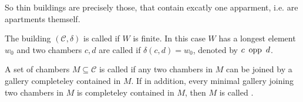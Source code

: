 So thin buildings are precisely those, that contain excatly one apparment, i.e. are apartments themself.

\begin{defi}
	The building $(\mathcal{C},\delta)$ is called  if $W$ is finite. In this case $W$ has a longest element $w_0$ and two chambers $c,d$ are called  if $\delta(c,d) = w_0$, denoted by $c \opp d$.
\end{defi}

\begin{defi}
	A set of chambers $M \subseteq \mathcal{C}$ is called  if any two chambers in $M$ can be joined by a gallery completeley contained in $M$. If in addition, every minimal gallery joining two chambers in $M$ is completeley contained in $M$, then $M$ is called .
\end{defi}